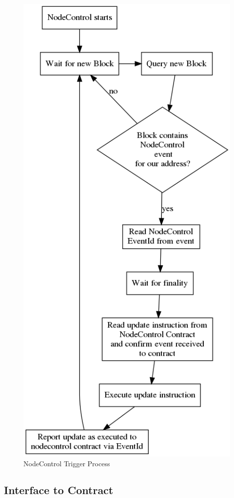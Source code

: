 \begin{figure}[ht]
	\centering
    \includegraphics[height=0.65\textheight,keepaspectratio]{./images/nodecontrol.png}
	\caption{NodeControl Trigger Process}
	\label{fig:nctrigger}
\end{figure}

\newpage
\subsection{Interface to Contract}


